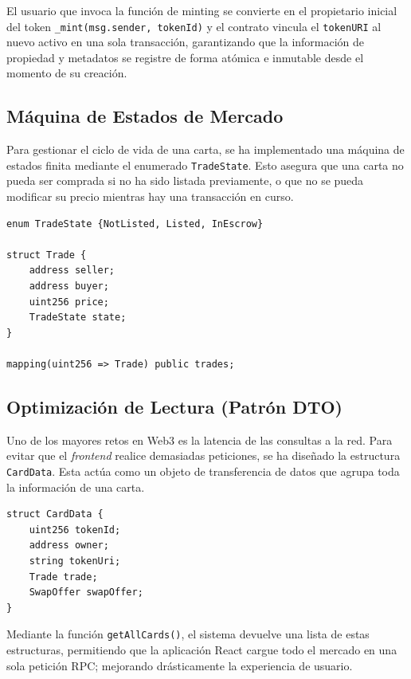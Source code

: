 El usuario que invoca la función de minting se convierte en el propietario inicial del token \texttt{\_mint(msg.sender, tokenId)} 
y el contrato vincula el \texttt{tokenURI} al nuevo activo en una sola transacción, garantizando que la información de propiedad 
y metadatos se registre de forma atómica e inmutable desde el momento de su creación.

\subsection{Máquina de Estados de Mercado}
Para gestionar el ciclo de vida de una carta, se ha implementado una máquina de estados finita mediante
el enumerado \texttt{TradeState}. Esto asegura que una carta no pueda ser comprada si no ha sido listada
previamente, o que no se pueda modificar su precio mientras hay una transacción en curso.\\

\begin{lstlisting}[language=Solidity, caption=Definición de estados y estructura de intercambio]
enum TradeState {NotListed, Listed, InEscrow}

struct Trade {
	address seller;
	address buyer;
	uint256 price;
	TradeState state;
}

mapping(uint256 => Trade) public trades;
\end{lstlisting}

\subsection{Optimización de Lectura (Patrón DTO)}
Uno de los mayores retos en Web3 es la latencia de las consultas a la red. Para evitar 
que el \textit{frontend} realice demasiadas peticiones, se ha diseñado la estructura \texttt{CardData}.
Esta actúa como un objeto de transferencia de datos que agrupa toda la información de una carta.\\

\begin{lstlisting}[language=Solidity, caption=Estructura optimizada para la integración con el Frontend]
struct CardData {
	uint256 tokenId;
	address owner;
	string tokenUri;
	Trade trade;
	SwapOffer swapOffer;
}
\end{lstlisting}

Mediante la función \texttt{getAllCards()}, el sistema devuelve una lista de estas estructuras,
permitiendo que la aplicación React cargue todo el mercado en una sola petición RPC;
mejorando drásticamente la experiencia de usuario.

